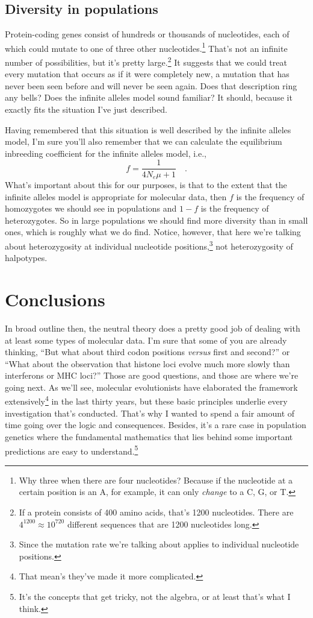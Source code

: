 \subsection*{Diversity in populations}

Protein-coding genes consist of hundreds or thousands of nucleotides,
each of which could mutate to one of three other
nucleotides.\footnote{Why three when there are four nucleotides?
  Because if the nucleotide at a certain position is an A, for
  example, it can only {\it change\/} to a C, G, or T.} That's not an
infinite number of possibilities, but it's pretty large.\footnote{If a
  protein consists of 400 amino acids, that's 1200 nucleotides. There
  are $4^{1200} \approx 10^{720}$ different sequences that are 1200
  nucleotides long.} It suggests that we could treat every mutation
that occurs as if it were completely new, a mutation that has never
been seen before and will never be seen again. Does that description
ring any bells? Does the infinite alleles model sound familiar? It
should, because it exactly fits the situation I've just
described.

Having remembered that this situation is well described by the
infinite alleles model, I'm sure you'll also remember that we can
calculate the equilibrium inbreeding coefficient for the infinite
alleles model, i.e.,
\[
f = \frac{1}{4N_e\mu + 1} \quad .
\]
What's important about this for our purposes, is that to the extent
that the infinite alleles model is appropriate for molecular data,
then $f$ is the frequency of homozygotes we should see in populations
and $1-f$ is the frequency of heterozygotes. So in large populations
we should find more diversity than in small ones, which is roughly
what we do find. Notice, however, that here we're talking about
heterozygosity at individual nucleotide positions,\footnote{Since the
  mutation rate we're talking about applies to individual nucleotide
  positions.} not heterozygosity of halpotypes.

\section*{Conclusions}

In broad outline then, the neutral theory does a pretty good job of
dealing with at least some types of molecular data. I'm sure that some
of you are already thinking, ``But what about third codon positions
{\it versus\/} first and second?'' or ``What about the observation
that histone loci evolve much more slowly than interferons or MHC
loci?''  Those are good questions, and those are where we're going
next. As we'll see, molecular evolutionists have elaborated the
framework extensively\footnote{That mean's they've made it more
  complicated.} in the last thirty years, but these basic principles
underlie every investigation that's conducted. That's why I wanted to
spend a fair amount of time going over the logic and
consequences. Besides, it's a rare case in population genetics where
the fundamental mathematics that lies behind some important
predictions are easy to understand.\footnote{It's the concepts that
  get tricky, not the algebra, or at least that's what I think.}

\vfill

